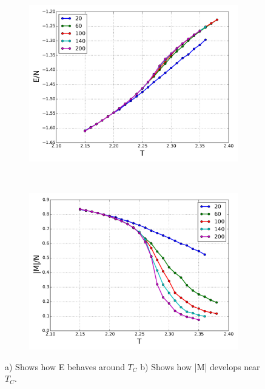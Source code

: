 \begin{figure}[H]
    \centering
    \begin{subfigure}{0.5\textwidth}
        \centering
        \includegraphics[width=\linewidth]{result/bilder/Tc/e-Tc}
        \caption{}
    \end{subfigure}%
    ~ 
    \begin{subfigure}{0.5\textwidth}
        \centering
        \includegraphics[width=\linewidth]{result/bilder/Tc/m-Tc}
        \caption{}
    \end{subfigure}
    \caption{a) Shows how E behaves around $T_C$ b) Shows how |M| develops near $T_C$.}
    \label{fig:tc-E-M}
\end{figure}












